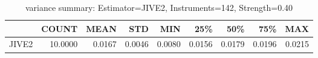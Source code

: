 \begin{table}[ht]
\centering
\caption{variance summary: Estimator=JIVE2, Instruments=142, Strength=0.40}
\begin{tabular}{lrrrrrrrr}
\toprule
 & COUNT & MEAN & STD & MIN & 25\% & 50\% & 75\% & MAX \\
\midrule
JIVE2 & 10.0000 & 0.0167 & 0.0046 & 0.0080 & 0.0156 & 0.0179 & 0.0196 & 0.0215 \\
\bottomrule
\end{tabular}
\end{table}
